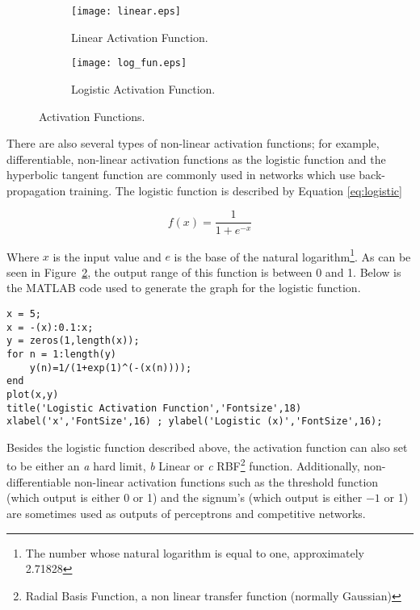 \documentclass{WileySev}
\begin{document}
\begin{figure}[h!]
  \centering
  \begin{subfigure}[b]{0.45\linewidth}
    \texttt{[image: linear.eps]}
    \caption{Linear Activation Function.}
    \label{fig:linear}
  \end{subfigure}
  \begin{subfigure}[b]{0.45\linewidth}
    \texttt{[image: log\_fun.eps]}
    \caption{Logistic Activation Function.}
    \label{fig:logistic}
  \end{subfigure}
  \caption{Activation Functions.}
  \label{fig:functions}
\end{figure}

There are also several types of non-linear activation functions; for example, differentiable, non-linear activation functions as the logistic function and the hyperbolic tangent function are commonly used in networks which use back-propagation training. The logistic function is described by Equation \ref{eq:logistic}

\begin{equation}
f(x)=\frac{1}{1+e^{-x}} \label{eq:logistic}
\end{equation}

Where $x$ is the input value and $e$ is the base of the natural logarithm\footnote{The number whose natural logarithm is equal to one, approximately 2.71828}. As can be seen in Figure~\ref{fig:logistic}, the output range of this function is between 0 and 1. Below is the MATLAB code used to generate the graph for the logistic function.

\begin{lstlisting}
x = 5;
x = -(x):0.1:x;
y = zeros(1,length(x));
for n = 1:length(y)
    y(n)=1/(1+exp(1)^(-(x(n))));
end
plot(x,y)
title('Logistic Activation Function','Fontsize',18)
xlabel('x','FontSize',16) ; ylabel('Logistic (x)','FontSize',16);
\end{lstlisting}

Besides the logistic function described above, the activation function can also set to be either an \textit{a} hard limit, \textit{b} Linear or \textit{c} RBF\footnote{Radial Basis Function, a non linear transfer function (normally Gaussian)} function. Additionally, non-differentiable non-linear activation functions such as the threshold function (which output is either 0 or 1) and the signum's (which output is either $-1$ or 1) are sometimes used as outputs of perceptrons and competitive networks.
\end{document}
